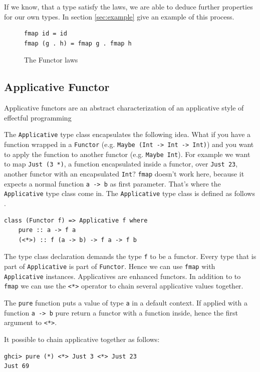 If we know, that a type satisfy the laws, we are able to deduce further properties for our own types. In section \ref{sec:example} give an example of this process.

\begin{figure}
  \centering
\begin{verbatim}
fmap id = id
fmap (g . h) = fmap g . fmap h
\end{verbatim}
  \caption{The Functor laws}
  \label{fig:functorlaws}
\end{figure}

\subsection{Applicative Functor}
\label{sec:applicatives}

Applicative functors are an abstract characterization of an applicative style of effectful programming \cite{mcbride} \cite{control.applicative}

The \verb|Applicative| type class encapsulates the following idea. What if you have a function wrapped in a \verb|Functor| (e.g. \verb|Maybe (Int -> Int -> Int)|) and you want to apply the function to another functor (e.g. \verb|Maybe Int|). For example we want to map \verb|Just (3 *)|, a function encapsulated inside a functor, over \verb|Just 23|, another functor with an encapsulated \verb|Int|? \verb|fmap| doesn't work here, because it expects a normal function \verb|a -> b| as first parameter. That's where the \verb|Applicative| type class come in. 
The \verb|Applicative| type class is defined as follows \cite{control.applicative}.
\begin{verbatim}
class (Functor f) => Applicative f where
    pure :: a -> f a
    (<*>) :: f (a -> b) -> f a -> f b
\end{verbatim}

The type class declaration demands the type \verb|f| to be a functor. Every type that is part of \verb|Applicative| is part of \verb|Functor|. Hence we can use \verb|fmap| with \verb|Applicative| instances.
Applicatives are enhanced functors. In addition to to \verb|fmap| we can use the \verb|<*>| operator to chain several applicative values together.

The \verb|pure| function puts a value of type \verb|a| in a default context. If applied with a function \verb|a -> b| pure return a functor with a function inside, hence the first argument to \verb|<*>|.

It possible to chain applicative together as follows:
\begin{verbatim}
ghci> pure (*) <*> Just 3 <*> Just 23
Just 69
\end{verbatim}

